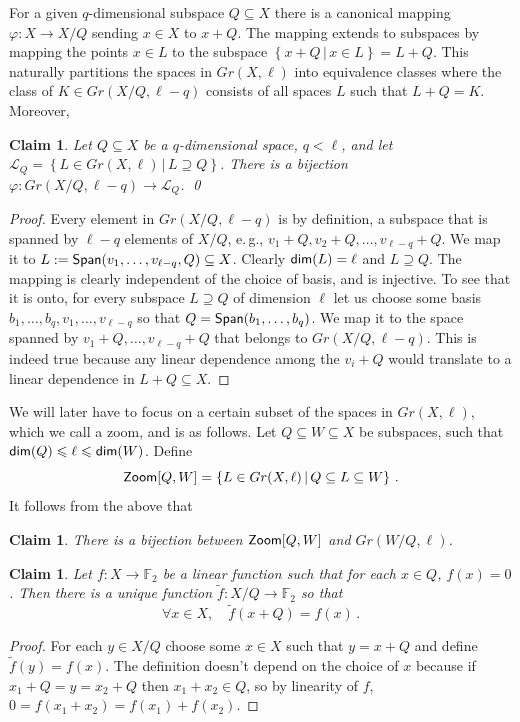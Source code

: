 \documentclass[11pt]{article}
\numberwithin{equation}{section}
\newtheorem{claim}[theorem]{Claim}
\theoremstyle{definition}
\theoremstyle{plain}
\newcommand{\eg}{e.\,g.}
\newcommand\Set[2]{ \left\{ #1 \,  \vert  \, #2\right\} }
\newcommand\spn{{\sf Span}}
\newcommand*\dimm{{\sf dim}}
\renewcommand\le{\leqslant}
\renewcommand\subset{\subseteq}
\renewcommand\supset{\supseteq}
\newcommand{\Zoom}{{\sf Zoom}}
\def\L{\mathcal{L}}
\def\F{\mathbb{F}}
\def\L{\mathcal{L}}
\begin{document}
For a given $q$-dimensional subspace $Q\subset X$ there is a canonical mapping $\varphi:X\to X/Q$ sending $x\in X$ to $x+Q$. The mapping extends to subspaces by mapping the points $x\in L$ to the subspace $\Set{ x+Q}{x\in L} = L+Q$. This naturally partitions the spaces in $Gr(X,\ell)$ into equivalence classes where the class of $ K \in Gr(X/Q,\ell-q)$ consists of all spaces $L$ such that $L+Q= K$.
%
Moreover,
\begin{claim}
Let $Q\subset X$ be a $q$-dimensional space, $q<\ell$, and let $\L_Q = \Set{ L \in Gr(X,\ell) }{ L\supset Q}$. There is a bijection $\varphi: Gr(X/Q,\ell-q)\to \L_Q$.
\qed
\end{claim}
\begin{proof}
Every element in $Gr(X/Q,\ell-q)$ is by definition, a subspace that is spanned by $\ell-q$ elements of $X/Q$, \eg, $v_1 + Q, v_2+Q, \ldots, v_{\ell-q}+Q$. We map it to $L := \spn (v_1,\ldots,v_{\ell-q},Q)\subset X$. Clearly $\dimm(L)=\ell$ and $L\supset Q$. The mapping is clearly independent of the choice of basis, and is injective. To see that it is onto, for every subspace $L\supset Q$ of dimension $\ell$ let us choose some basis $b_1,\ldots,b_q,v_1,\ldots,v_{\ell-q}$ so that $Q = \spn(b_1,\ldots,b_q)$. We map it to the space spanned by $v_1+Q,\ldots,v_{\ell-q}+Q$ that belongs to $Gr(X/Q,\ell-q)$. This is indeed true because any linear dependence among the $v_i+Q$ would translate to a linear dependence in $L+Q\subset X$.
\end{proof}

We will later have to focus on a certain subset of the spaces in $Gr(X,\ell)$, which we call a zoom, and is as follows. Let $Q\subset W \subset X$ be subspaces, such that $\dimm(Q) \le \ell \le \dimm(W)$. Define
\[ \Zoom[Q,W] = \Set{ L \in Gr(X,\ell) }{ Q\subset L \subset W}\,.
\]
It follows from the above that
\begin{claim}
There is a bijection between $\Zoom[Q,W]$ and $Gr(W/Q,\ell)$.
\end{claim}

\begin{claim}\label{claim:quotient-function}
Let $f:X\to\F_2$ be a linear function such that for each $x\in Q$, $f(x)=0$.
Then there is a unique function $\tilde f:X/Q\to\F_2$ so that
\[ \forall x\in X,\quad  \tilde f (x+Q) = f(x)\,. \]
\end{claim}
\begin{proof}
For each $y\in X/Q$ choose some $x\in X$ such that $y = x+Q$ and define $\tilde f(y) = f(x)$. The definition doesn't depend on the choice of $x$ because if $x_1+Q=y=x_2+Q$ then $x_1+x_2\in Q$, so by linearity of $f$, $0=f(x_1+x_2)=f(x_1)+f(x_2)$.
\end{proof}
\end{document}
